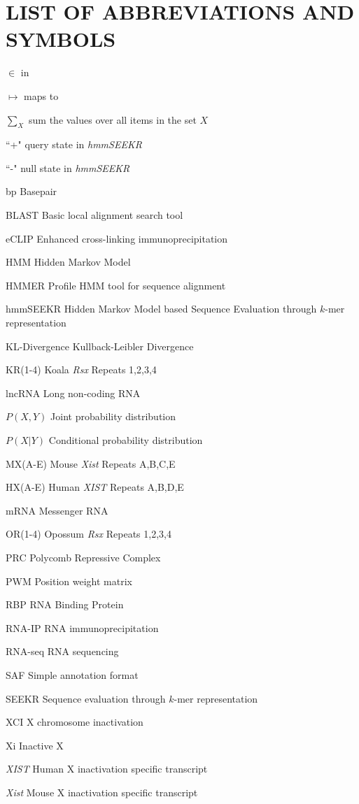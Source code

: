 \documentclass[11pt,letterpaper,twosided]{report}
\newenvironment{abbreviations}{\begin{list}{}{\renewcommand{\makelabel}{\abbrlabel}}}{\end{list}}
\newcommand{\abbrlabel}[1]{\makebox[3cm][l]{\textbf{#1}\ \dotfill}}
\begin{document}
\chapter*{LIST OF ABBREVIATIONS AND SYMBOLS}
\begin{abbreviations}
\item [$\in$] in
\item [$\mapsto$] maps to
\item [$\sum_X$] sum the values over all items in the set $X$
\item [``+"] query state in \emph{hmmSEEKR}
\item [``-"] null state in \textit{hmmSEEKR}
\item [bp] Basepair
\item [BLAST] Basic local alignment search tool

\item [eCLIP] Enhanced cross-linking immunoprecipitation 
\item [HMM] Hidden Markov Model
\item [HMMER] Profile HMM tool for sequence alignment 
\item[hmmSEEKR] Hidden Markov Model based Sequence Evaluation through $k$-mer representation
\item [KL-Divergence] Kullback-Leibler Divergence
\item [KR(1-4)] Koala \textit{Rsx} Repeats 1,2,3,4
\item [lncRNA] Long non-coding RNA
\item [$P(X,Y)$] Joint probability distribution
\item [$P(X|Y)$] Conditional probability distribution
\item [MX(A-E)] Mouse \textit{Xist} Repeats A,B,C,E
\item [HX(A-E)] Human \textit{XIST} Repeats A,B,D,E
\item [mRNA] Messenger RNA
\item [OR(1-4)] Opossum \textit{Rsx} Repeats 1,2,3,4

\item [PRC] Polycomb Repressive Complex
\item [PWM] Position weight matrix 

\item [RBP] RNA Binding Protein
\item [RNA-IP] RNA immunoprecipitation
\item [RNA-seq] RNA sequencing 
\item [SAF] Simple annotation format
\item [SEEKR] Sequence evaluation through $k$-mer representation
\item [XCI] X chromosome inactivation
\item [Xi] Inactive X
\item [\textit{XIST}] Human X inactivation specific transcript
\item [\textit{Xist}] Mouse X inactivation specific transcript

\end{abbreviations}
\clearpage
\end{document}
